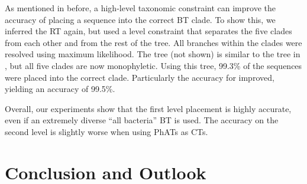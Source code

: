 As mentioned in  before,
a high-level taxonomic constraint can improve the accuracy of placing a sequence into the correct \ac{BT} clade.
To show this, we inferred the  \ac{RT} again,
but used a  level constraint
that separates the five clades from each other and from the rest of the tree.
All branches within the clades were resolved using maximum likelihood.
The tree (not shown) is similar to the tree in , but all five clades are now monophyletic.
Using this tree, 99.3\% of the sequences were placed into the correct clade.
Particularly the accuracy for  improved, yielding an accuracy of 99.5\%.


Overall, our experiments show that the first level placement is highly accurate,
even if an extremely diverse ``all bacteria'' \acl{BT} is used.
The accuracy on the second level is slightly worse when using \acp{PhAT} as \acp{CT}.



\section{Conclusion and Outlook}
\label{ch:AutomaticTrees:sec:ConclusionOutlook}


